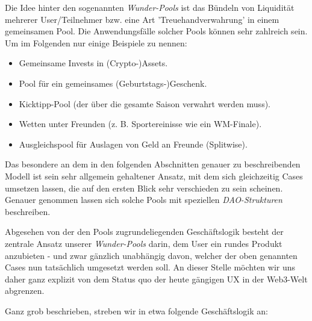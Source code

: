 
Die Idee hinter den sogenannten \textit{Wunder-Pools} ist das Bündeln von Liquidität mehrerer User/Teilnehmer bzw. eine Art 'Treuehandverwahrung' in einem gemeinsamen Pool. Die Anwendungsfälle solcher Pools können sehr zahlreich sein. Um im Folgenden nur einige Beispiele zu nennen:  

\begin{itemize}
  \item Gemeinsame Invests in (Crypto-)Assets.
  \item Pool für ein gemeinsames (Geburtstags-)Geschenk.
  \item Kicktipp-Pool (der über die gesamte Saison verwahrt werden muss).
  \item Wetten unter Freunden (z. B. Sportereinisse wie ein WM-Finale).
  \item Ausgleichspool für Auslagen von Geld an Freunde (Splitwise).
\end{itemize}

\vspace{0.2cm}

Das besondere an dem in den folgenden Abschnitten genauer zu beschreibenden Mo\-dell ist sein sehr allgemein gehaltener Ansatz, mit dem sich gleichzeitig Cases umsetzen lassen, die auf den ersten Blick sehr verschieden zu sein scheinen. Genauer genommen lassen sich solche Pools mit speziellen \textit{DAO-Strukturen} beschreiben.

Abgesehen von der den Pools zugrundeliegenden Geschäftslogik besteht der zentrale Ansatz unserer \textit{Wunder-Pools} darin, dem User ein rundes Produkt anzubieten - und zwar gänzlich unabhängig davon, welcher der oben genannten Cases nun tatsächlich umgesetzt werden soll. An dieser Stelle möchten wir uns daher ganz explizit von dem Status quo der heute gängigen UX in der Web3-Welt abgrenzen.

\vspace{0.4cm}

Ganz grob beschrieben, streben wir in etwa folgende Geschäftslogik an:

